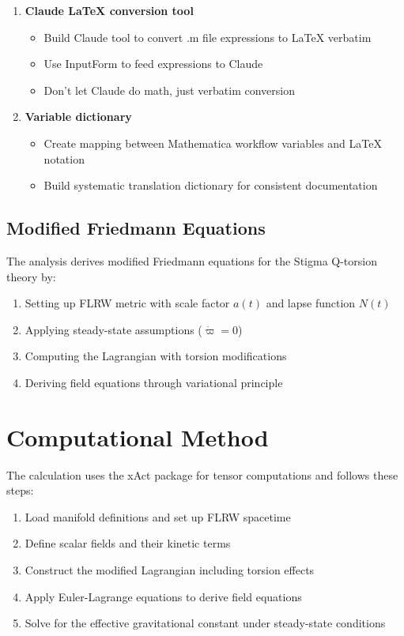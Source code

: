 \documentclass{article}
\begin{document}
\begin{enumerate}
    \item \textbf{Claude LaTeX conversion tool}
    \begin{itemize}
        \item Build Claude tool to convert .m file expressions to LaTeX verbatim
        \item Use InputForm to feed expressions to Claude
        \item Don't let Claude do math, just verbatim conversion
    \end{itemize}
    
    \item \textbf{Variable dictionary}
    \begin{itemize}
        \item Create mapping between Mathematica workflow variables and LaTeX notation
        \item Build systematic translation dictionary for consistent documentation
    \end{itemize}
\end{enumerate}

\subsection{Modified Friedmann Equations}

The analysis derives modified Friedmann equations for the Stigma Q-torsion theory by:
\begin{enumerate}
    \item Setting up FLRW metric with scale factor $a(t)$ and lapse function $N(t)$
    \item Applying steady-state assumptions ($\dot{\varpi} = 0$)
    \item Computing the Lagrangian with torsion modifications
    \item Deriving field equations through variational principle
\end{enumerate}

\section{Computational Method}

The calculation uses the xAct package for tensor computations and follows these steps:
\begin{enumerate}
    \item Load manifold definitions and set up FLRW spacetime
    \item Define scalar fields and their kinetic terms
    \item Construct the modified Lagrangian including torsion effects
    \item Apply Euler-Lagrange equations to derive field equations
    \item Solve for the effective gravitational constant under steady-state conditions
\end{enumerate}
\end{document}
